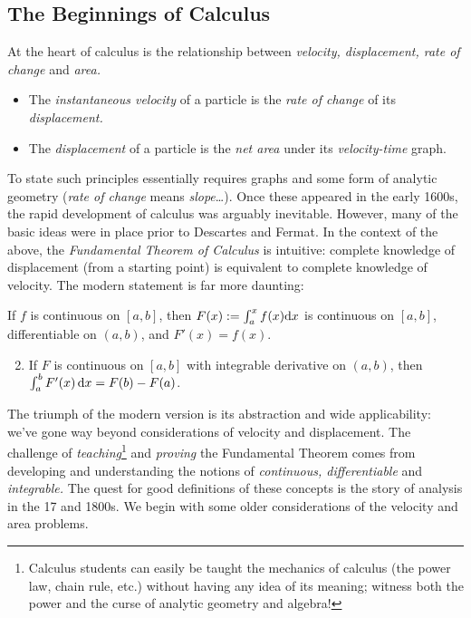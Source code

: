 \subsection{The Beginnings of Calculus}\label{sec:calc1}

At the heart of calculus is the relationship between \emph{velocity, displacement, rate of change} and \emph{area.}
\begin{itemize}\itemsep0pt
  \item The \emph{instantaneous velocity} of a particle is the \emph{rate of change} of its \emph{displacement.}
  \item The \emph{displacement} of a particle is the \emph{net area} under its \emph{velocity-time} graph.
\end{itemize}
To state such principles essentially requires graphs and some form of analytic geometry (\emph{rate of change} means \emph{slope}\ldots). Once these appeared in the early 1600s, the rapid development of calculus was arguably inevitable. However, many of the basic ideas were in place prior to Descartes and Fermat.\smallbreak
In the context of the above, the \emph{Fundamental Theorem of Calculus} is intuitive: complete knowledge of displacement (from a starting point) is equivalent to complete knowledge of velocity. The modern statement is far more daunting:

\begin{thm*}{}{}
\exstart If $f$ is continuous on $[a,b]$, then $F(x):=\int_a^xf(x){\mathrm{d} x}$ is continuous on $[a,b]$, differentiable on $(a,b)$, and $F'(x)=f(x)$.
\begin{enumerate}\setcounter{enumi}{1}
  \item If $F$ is continuous on $[a,b]$ with integrable derivative on $(a,b)$, then $\int_a^bF'(x)\,{\mathrm{d} x}=F(b)-F(a)$.
\end{enumerate}
\end{thm*}

The triumph of the modern version is its abstraction and wide applicability: we've gone way beyond considerations of velocity and displacement. The challenge of \emph{teaching}\footnote{Calculus students can easily be taught the mechanics of calculus (the power law, chain rule, etc.) without having any idea of its meaning; witness both the power and the curse of analytic geometry and algebra!} and \emph{proving} the Fundamental Theorem comes from developing and understanding the notions of \emph{continuous, differentiable} and \emph{integrable.} The quest for good definitions of these concepts is the story of analysis in the 17 and 1800s. We begin with some older considerations of the velocity and area problems.


